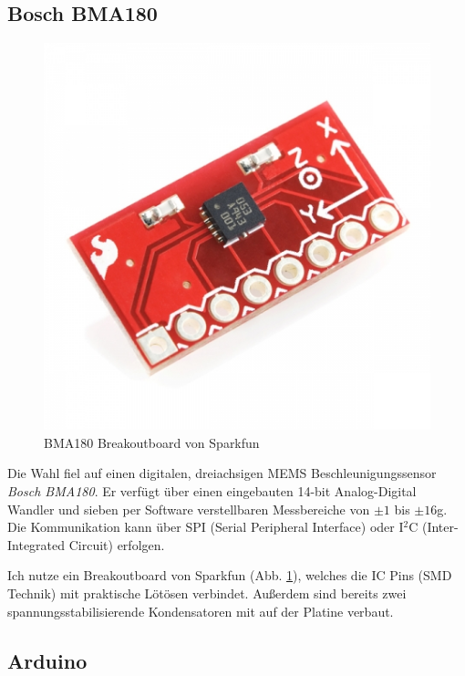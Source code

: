\documentclass[12pt,a4paper]{scrartcl}
\begin{document}
\subsection{Bosch BMA180}
\begin{figure}[ht]
\centering
\includegraphics[scale=.4]{hardwareimages/bma180_breakout.jpg}
\caption{BMA180 Breakoutboard von Sparkfun}
\label{bma180_breakout}
\end{figure}

Die Wahl fiel auf einen digitalen, dreiachsigen MEMS Beschleunigungssensor \textit{Bosch BMA180}. Er verfügt über einen eingebauten 14-bit Analog-Digital Wandler und sieben per Software verstellbaren Messbereiche von $\pm1$ bis $\pm16$g.
Die Kommunikation kann über SPI (Serial Peripheral Interface)  oder I$^2$C (Inter-Integrated Circuit) erfolgen.

Ich nutze ein Breakoutboard von Sparkfun (Abb. \ref{bma180_breakout}), welches die IC Pins (SMD Technik) mit praktische Lötösen verbindet. Außerdem sind bereits zwei spannungsstabilisierende Kondensatoren mit auf der Platine verbaut.

\subsection{Arduino}
\end{document}
